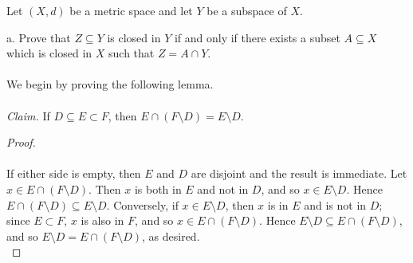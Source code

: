 Let $(X, d)$ be a metric space and let $Y$ be a subspace of $X$.

a.  Prove that $Z \subseteq Y$ is closed in $Y$ if and only if there exists a subset $A \subseteq X$ which is closed in
    $X$ such that $Z = A \cap Y$. 
\ \\\\
We begin by proving the following lemma. \ \\
\ \\
\emph{Claim.} If $D \subseteq E \subset F$, then $E \cap (F \setminus D) = E \setminus D$.
\begin{proof}\ \\\\
    If either side is empty, then $E$ and $D$ are disjoint and the result is immediate.
    Let $x \in E \cap (F \setminus D)$. Then $x$ is both in $E$ and not in $D$, and so $x \in E \setminus D$. Hence
    $E \cap (F \setminus D) \subseteq E \setminus D$.
    Conversely, if $x \in E \setminus D$, then $x$ is in $E$ and is not in $D$; since $E \subset F$, $x$ is also in $F$,
    and so $x \in E \cap (F \setminus D)$. Hence $E \setminus D \subseteq E \cap (F \setminus D)$, and so 
    $E \setminus D = E \cap (F \setminus D)$, as desired.
    \ \\
\end{proof}

